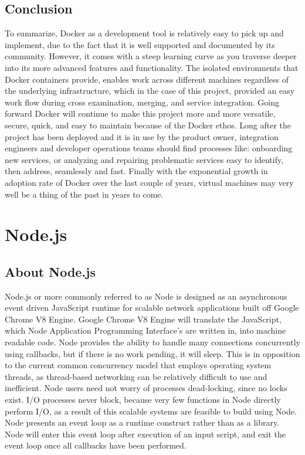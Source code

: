 \subsection{Conclusion}
	To summarize, Docker as a development tool is relatively easy to pick up and implement, due to the fact that it is well supported and documented by its community. However, it comes with a steep learning curve as you traverse deeper into its more advanced features and functionality. The isolated environments that Docker containers provide, enables work across different machines regardless of the underlying infrastructure, which in the case of this project, provided an easy work flow during cross examination, merging, and service integration. Going forward Docker will continue to make this project more and more versatile, secure, quick, and easy to maintain because of the Docker ethos. Long after the project has been deployed and it is in use by the product owner, integration engineers and developer operations teams should find processes like: onboarding new services, or analyzing and repairing problematic services easy to identify, then address, seamlessly and fast. Finally with the exponential growth in adoption rate of Docker over the last couple of years, virtual machines may very well be a thing of the past in years to come.

\section{Node.js}
\subsection{About Node.js}
	Node.js or more commonly referred to as Node is designed as an asynchronous event driven JavaScript runtime for scalable network applications built off Google Chrome V8 Engine. Google Chrome V8 Engine will translate the JavaScript, which Node Application Programming Interface's are written in, into machine readable code. Node provides the ability to handle many connections concurrently using callbacks, but if there is no work pending, it will sleep\cite{node}. This is in opposition to the current common concurrency model that employs operating system threads, as thread-based networking can be relatively difficult to use and inefficient. Node users need not worry of processes dead-locking, since no locks exist. I/O processes never block, because very few functions in Node directly perform I/O, as a result of this scalable systems are feasible to build using Node. Node presents an event loop as a runtime construct rather than as a library. Node will enter this event loop after execution of an input script, and exit the event loop once all callbacks have been performed\cite{node}.
    
